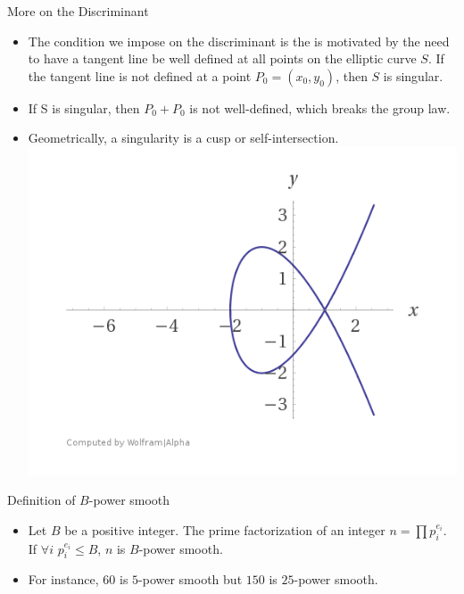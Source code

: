\documentclass{beamer}
\begin{document}
	\begin{frame}{More on the Discriminant}
		\begin{itemize}
			\item The condition we impose on the discriminant is the is motivated by the need to have a tangent line be well defined at all points on the elliptic curve $S$. If the tangent line is not defined at a point $P_0=(x_0,y_0)$, then $S$ is singular.
			\item If S is singular, then $P_0+P_0$ is not well-defined, which breaks the group law.
			\item Geometrically, a singularity is a cusp or self-intersection.
			\newline \includegraphics[scale=.3]{SingularCurve.png}
		\end{itemize}
	\end{frame}
	
	\begin{frame}{Definition of $B$-power smooth}
		\begin{itemize}
			\item Let $B$ be a positive integer. The prime factorization of an integer $n=\prod p_{i}^{e_{i}}$. If $\forall i$ $p_{i}^{e_{i}} \leq B$, $n$ is $B$-power smooth.
			\item For instance, $60$ is $5$-power smooth but $150$ is $25$-power smooth.
		\end{itemize}
	\end{frame}
	
\end{document}
